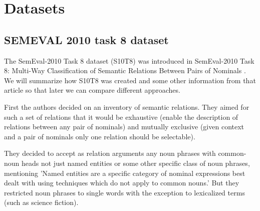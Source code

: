 \chapter{Datasets}



\section{SEMEVAL 2010 task 8 dataset}
The SemEval-2010 Task 8 dataset (S10T8) was introduced in SemEval-2010 Task 8: Multi-Way Classification of Semantic Relations Between Pairs of Nominals \cite{semeval}. We will summarize how S10T8 was created and some other information from that article so that later we can compare different approaches.


First the authors decided on an inventory of semantic relations. They aimed for such a set of relations that it would be exhaustive (enable the description of relations between any pair of nominals) and mutually exclusive (given context and a pair of nominals only one relation should be selectable).  

They decided to accept as relation arguments any noun phrases with common-noun heads not just named entities or some other specific class of noun phrases, mentioning  'Named entities are a specific category of nominal expressions best dealt with using techniques which do not apply to common nouns.'  But they restricted noun phrases to single words with the exception to lexicalized terms (such as  science fiction).



